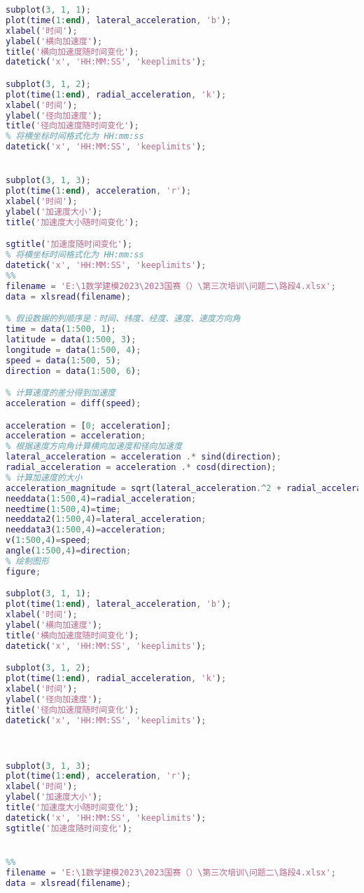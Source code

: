 \documentclass[withoutpreface,bwprint]{cumcmthesis} %
\begin{document}
\begin{appendices}
\begin{lstlisting}[language=matlab]
subplot(3, 1, 1);
plot(time(1:end), lateral_acceleration, 'b');
xlabel('时间');
ylabel('横向加速度');
title('横向加速度随时间变化');
datetick('x', 'HH:MM:SS', 'keeplimits');

subplot(3, 1, 2);
plot(time(1:end), radial_acceleration, 'k');
xlabel('时间');
ylabel('径向加速度');
title('径向加速度随时间变化');
% 将横坐标时间格式化为 HH:mm:ss
datetick('x', 'HH:MM:SS', 'keeplimits');


subplot(3, 1, 3);
plot(time(1:end), acceleration, 'r');
xlabel('时间');
ylabel('加速度大小');
title('加速度大小随时间变化');

sgtitle('加速度随时间变化');
% 将横坐标时间格式化为 HH:mm:ss
datetick('x', 'HH:MM:SS', 'keeplimits');
%%
filename = 'E:\1数学建模2023\2023国赛（）\第三次培训\问题二\路段4.xlsx';
data = xlsread(filename);

% 假设数据的列顺序是：时间、纬度、经度、速度、速度方向角
time = data(1:500, 1);
latitude = data(1:500, 3);
longitude = data(1:500, 4);
speed = data(1:500, 5);
direction = data(1:500, 6);

% 计算速度的差分得到加速度
acceleration = diff(speed);

acceleration = [0; acceleration];
acceleration = acceleration;
% 根据速度方向角计算横向加速度和径向加速度
lateral_acceleration = acceleration .* sind(direction);
radial_acceleration = acceleration .* cosd(direction);
% 计算加速度的大小
acceleration_magnitude = sqrt(lateral_acceleration.^2 + radial_acceleration.^2);
needdata(1:500,4)=radial_acceleration;
needtime(1:500,4)=time;
needdata2(1:500,4)=lateral_acceleration;
needdata3(1:500,4)=acceleration;
v(1:500,4)=speed;
angle(1:500,4)=direction;
% 绘制图形
figure;

subplot(3, 1, 1);
plot(time(1:end), lateral_acceleration, 'b');
xlabel('时间');
ylabel('横向加速度');
title('横向加速度随时间变化');
datetick('x', 'HH:MM:SS', 'keeplimits');

subplot(3, 1, 2);
plot(time(1:end), radial_acceleration, 'k');
xlabel('时间');
ylabel('径向加速度');
title('径向加速度随时间变化');
datetick('x', 'HH:MM:SS', 'keeplimits');



subplot(3, 1, 3);
plot(time(1:end), acceleration, 'r');
xlabel('时间');
ylabel('加速度大小');
title('加速度大小随时间变化');
datetick('x', 'HH:MM:SS', 'keeplimits');
sgtitle('加速度随时间变化');


%%
filename = 'E:\1数学建模2023\2023国赛（）\第三次培训\问题二\路段4.xlsx';
data = xlsread(filename);


\end{lstlisting}
\end{appendices}
\end{document}
